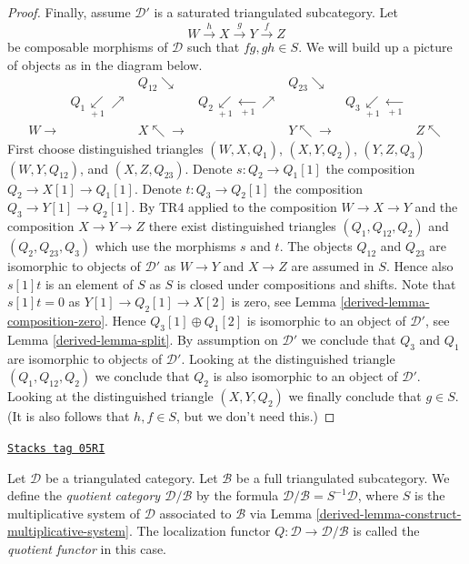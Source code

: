 \begin{proof}
\medskip\noindent
Finally, assume $\mathcal{D}'$ is a saturated triangulated subcategory.
Let
$$
W \xrightarrow{h}
X \xrightarrow{g}
Y \xrightarrow{f} Z
$$
be composable morphisms of $\mathcal{D}$ such that $fg, gh \in S$.
We will build up a picture of objects as in the diagram below.
$$
\begin{array}{ccccccc} &  & Q_{12} \searrow &  & Q_{23} \searrow &  &  \\  & Q_1 \underset{\! + \! 1}{\swarrow}\nearrow &  & Q_2 \underset{\! + \! 1}{\swarrow}\underset{\! + \! 1}{\longleftarrow}\nearrow &  & Q_3 \underset{\! + \! 1}{\swarrow}\underset{\! + \! 1}{\longleftarrow} &  \\ W \longrightarrow &  & X \nwarrow\longrightarrow &  & Y \nwarrow\longrightarrow &  & Z \nwarrow\end{array}
$$
First choose distinguished triangles
$(W, X, Q_1)$, $(X, Y, Q_2)$, $(Y, Z, Q_3)$ $(W, Y, Q_{12})$, and
$(X, Z, Q_{23})$. Denote $s : Q_2 \to Q_1[1]$ the composition
$Q_2 \to X[1] \to Q_1[1]$. Denote $t : Q_3 \to Q_2[1]$ the
composition $Q_3 \to Y[1] \to Q_2[1]$.
By TR4 applied to the composition $W \to X \to Y$
and the composition $X \to Y \to Z$ there exist
distinguished triangles $(Q_1, Q_{12}, Q_2)$ and $(Q_2, Q_{23}, Q_3)$
which use the morphisms $s$ and $t$.
The objects $Q_{12}$ and $Q_{23}$ are isomorphic to objects of
$\mathcal{D}'$ as $W \to Y$ and $X \to Z$ are assumed in $S$.
Hence also $s[1]t$ is an element of $S$ as $S$ is closed under compositions
and shifts.
Note that $s[1]t = 0$ as $Y[1] \to Q_2[1] \to X[2]$ is zero, see
Lemma \ref{derived-lemma-composition-zero}.
Hence $Q_3[1] \oplus Q_1[2]$ is isomorphic to an object of
$\mathcal{D}'$, see Lemma \ref{derived-lemma-split}.
By assumption on $\mathcal{D}'$ we conclude that $Q_3$ and $Q_1$ are isomorphic
to objects of $\mathcal{D}'$. Looking at the distinguished triangle
$(Q_1, Q_{12}, Q_2)$ we conclude that $Q_2$ is also isomorphic to
an object of $\mathcal{D}'$. Looking at the distinguished triangle
$(X, Y, Q_2)$ we finally conclude that $g \in S$. (It is also
follows that $h, f \in S$, but we don't need this.)
\end{proof}

\begin{definition}
\label{derived-definition-quotient-category}
\href{https://stacks.math.columbia.edu/tag/05RI}{\texttt{Stacks tag 05RI}}

Let $\mathcal{D}$ be a triangulated category.
Let $\mathcal{B}$ be a full triangulated subcategory.
We define the {\it quotient category $\mathcal{D}/\mathcal{B}$}
by the formula $\mathcal{D}/\mathcal{B} = S^{-1}\mathcal{D}$, where
$S$ is the multiplicative system of $\mathcal{D}$ associated to
$\mathcal{B}$ via
Lemma \ref{derived-lemma-construct-multiplicative-system}.
The localization functor $Q : \mathcal{D} \to \mathcal{D}/\mathcal{B}$
is called the {\it quotient functor} in this case.
\end{definition}

